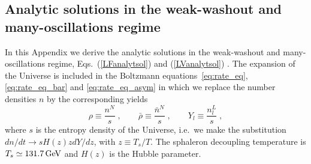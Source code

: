 \documentclass[prd,twocolumn,superscriptaddress,preprintnumbers,nofootinbib,
noshowpacs,groupedaddress]{revtex4-1} %
\begin{document}
\begin{appendix}

\section{Analytic solutions in the weak-washout and many-oscillations regime}\label{app:analytic}

In this Appendix we derive the analytic solutions in the weak-washout and many-oscillations regime, Eqs.~(\ref{LFanalytsol}) and (\ref{LVanalytsol}) . The expansion of the Universe is included in the Boltzmann equations~\eqref{eq:rate_eq}, \eqref{eq:rate_eq_bar} and \eqref{eq:rate_eq_asym} in which we replace the number densities $n$ by the corresponding yields
\begin{equation}
\rho \equiv \frac{n^N}{s} \;, \qquad \bar \rho \equiv \frac{\bar n^N}{s} \;, \qquad Y_l \equiv \frac{n^L_l}{s} \;, 
\end{equation}
where $s$ is the entropy density of the Universe, i.e.~we make the substitution $dn/dt \to s H(z) z dY/dz$, with $z \equiv T_s/T$. The sphaleron decoupling temperature is $T_s \simeq \unit[131.7]{GeV}$ and $H(z)$ is the Hubble parameter.

\end{appendix}
\end{document}
